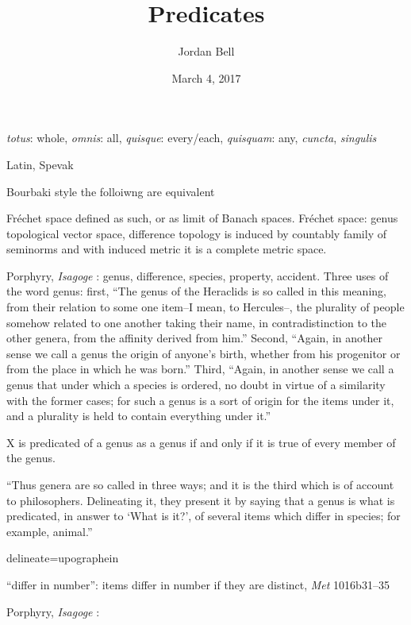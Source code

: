 \documentclass{article}
\begin{document}
\title{Predicates}
\author{Jordan Bell}
\date{March 4, 2017}

\maketitle

{\em totus}: whole, {\em omnis}: all, {\em quisque}: every/each, {\em quisquam}: any, {\em cuncta}, {\em singulis}


Latin, Spevak \cite{spevak}

Bourbaki style the folloiwng are equivalent

Fr\'echet space defined as such, or as limit of Banach spaces. Fr\'echet space: genus topological vector space, difference 
topology is induced by countably family of seminorms and with induced metric it is a complete metric space.

Porphyry, {\em Isagoge}  \cite{isagoge}: 
genus, difference, species, property, accident.
Three uses of the word genus: first, ``The genus of the Heraclids is so called in this meaning, from their relation to some one item--I mean, to Hercules--, the plurality of people somehow related to one another taking their name, in contradistinction to the other genera, from the affinity derived from him.'' \cite[p.~3, \S 1]{isagoge}
Second, ``Again, in another sense we call a genus the origin of anyone's birth, whether from his progenitor or from the place in which he was born.''
Third, ``Again, in another sense we call a genus that under which a species is ordered, no doubt in virtue of a similarity with the former cases; for such a genus is a sort of origin for the items under it, and a plurality is held to contain everything under it.'' \cite[p.~4, \S 1]{isagoge}

X is predicated of a genus as a genus if and only if it is true of every member of the genus. 

``Thus genera are so called in three ways; and it is the third which is of account to philosophers. Delineating it, they present it by saying that a genus is what is predicated, in answer to `What is it?', of several items which differ in species; for example, animal.'' \cite[p.~4, \S 1]{isagoge}

delineate=upographein

``differ in number'': items differ in number if they are distinct, {\em Met} 1016b31--35

Porphyry, {\em Isagoge} \cite[pp.~4--5, \S 2]{isagoge}:
\end{document}

